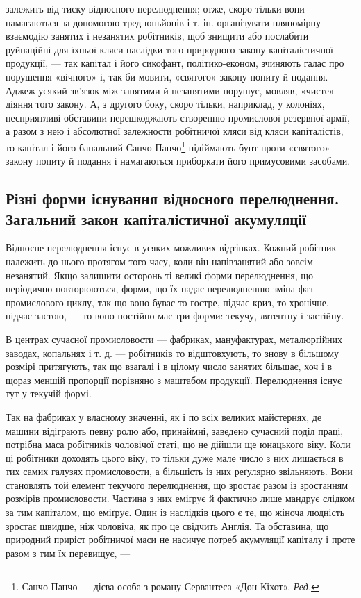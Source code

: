 \parcont{}  %
залежить від тиску відносного перелюднення; отже, скоро тільки вони намагаються за допомогою
тред-юньйонів і т. ін. організувати пляномірну взаємодію занятих і незанятих робітників, щоб знищити
або послабити руйнаційні для їхньої кляси наслідки того природного закону капіталістичної
продукції, — так капітал і його сикофант, політико-економ, зчиняють галас про порушення «вічного» і, так би
мовити, «святого» закону попиту й подання. Аджеж усякий зв’язок між занятими й незанятими
порушує, мовляв, «чисте» діяння того закону. А, з другого боку, скоро тільки, наприклад, у колоніях,
несприятливі обставини перешкоджають створенню промислової резервної армії, а разом з нею і
абсолютної залежности робітничої кляси від кляси капіталістів, то капітал і його банальний
Санчо-Панчо\footnote*{
Санчо-Панчо — дієва особа з роману Сервантеса «Дон-Кіхот». \emph{Ред.}
} підіймають
бунт проти «святого» закону попиту й подання і намагаються приборкати його примусовими засобами.

\subsection{Різні форми існування відносного перелюднення. Загальний закон капіталістичної акумуляції}

Відносне перелюднення існує в усяких можливих відтінках. Кожний робітник належить до нього протягом
того часу, коли він напівзанятий або зовсім незанятий. Якщо залишити осторонь ті великі форми
перелюднення, що періодично повторюються,
форми, що їх надає перелюдненню зміна фаз промислового циклу, так що воно буває то гостре, підчас
криз, то хронічне, підчас застою, — то воно постійно має три форми: текучу, лятентну і застійну.

В центрах сучасної промисловости — фабриках, мануфактурах, металюрґійних заводах, копальнях і т. д.
— робітників то відштовхують, то знову в більшому розмірі притягують, так що взагалі і в цілому
число занятих більшає, хоч і в щораз
меншій пропорції порівняно з маштабом продукції. Перелюднення існує тут у текучій формі.

Так на фабриках у власному значенні, як і по всіх великих майстернях, де машини відіграють певну
ролю або, принаймні, заведено сучасний поділ праці, потрібна маса робітників чоловічої статі, що не
дійшли ще юнацького віку. Коли ці робітники доходять цього віку, то тільки дуже мале число з них
лишається в тих самих галузях промисловости, а більшість із них реґулярно звільняють. Вони
становлять той елемент текучого перелюднення, що зростає разом із зростанням розмірів промисловости.
Частина з них еміґрує й фактично лише мандрує слідком за тим капіталом, що еміґрує. Один із
наслідків цього є те, що жіноча людність зростає швидше, ніж чоловіча, як про це свідчить Англія. Та
обставина, що природний приріст робітничої маси не насичує
потреб акумуляції капіталу і проте разом з тим їх перевищує, —
\parbreak{}  %
